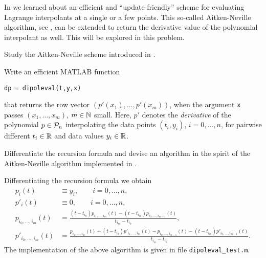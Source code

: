 
\begin{problem}
\label{prb:EvaluatingDerivatives}

In  we learned about an efficient and
``update-friendly'' scheme for evaluating Lagrange interpolants at a single or a
few points. This so-called Aitken-Neville algorithm, see , can
be extended to return the derivative value of the polynomial interpolant as well.
This will be explored in this problem. 

\begin{subproblem}[1]
  Study the Aitken-Neville scheme introduced in . 
\end{subproblem}

\begin{subproblem}[3]\label{dpe:sp:1}
Write an efficient MATLAB function
\begin{center}
\texttt{dp = dipoleval(t,y,x)}
\end{center}
that returns the row vector $(p'(x_{1}),\ldots,p'(x_{m}))$, when the argument
\texttt{x} passes $(x_{1},\ldots,x_{m})$, $m\in\mathbb{N}$ small.  Here, $p'$ denotes the
\emph{derivative} of the polynomial $p\in{\cal P}_{n}$ interpolating the
data points $(t_{i},y_{i})$, $i=0,\ldots,n$, for pairwise different
$t_{i}\in\mathbb{R}$ and data values $y_{i}\in\mathbb{R}$.

\begin{hint}
Differentiate the recursion formula  and
devise an algorithm in the spirit of the Aitken-Neville algorithm
implemented in .
\end{hint}

\begin{solution}
Differentiating the recursion formula  we obtain
%
\begin{equation*}
\begin{aligned}
p_i(t) &\equiv y_i, \qquad i = 0, \dots, n, \\
p'_i(t) &\equiv 0, \qquad i = 0, \dots, n, \\
p_{i_0,\dots,i_m}(t) &= \frac{ (t-t_{i_0}) p_{i_1,\dots,i_m}(t) - (t-t_{i_m}) p_{i_0,\dots,i_{m-1}}(t) }{t_{i_m}-t_{i_0}}, \\
p'_{i_0,\dots,i_m}(t) &= \frac
{ p_{i_1,\dots,i_m}(t) + (t-t_{i_0}) p'_{i_1,\dots,i_m}(t) - p_{i_0,\dots,i_{m-1}}(t) - (t-t_{i_m}) p'_{i_0,\dots,i_{m-1}}(t) } {t_{i_m}-t_{i_0}}.
\end{aligned}
\end{equation*}
%
The implementation of the above algorithm is given in file \texttt{dipoleval\_test.m}.
\end{solution}
\end{subproblem}


\end{problem}
